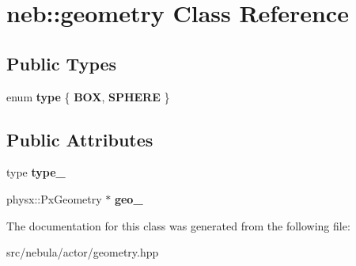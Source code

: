 \hypertarget{classneb_1_1geometry}{\section{neb\-:\-:geometry \-Class \-Reference}
\label{classneb_1_1geometry}
}
\subsection*{\-Public \-Types}
\begin{DoxyCompactItemize}
\item 
enum {\bfseries type} \{ {\bfseries \-B\-O\-X}, 
{\bfseries \-S\-P\-H\-E\-R\-E}
 \}
\end{DoxyCompactItemize}
\subsection*{\-Public \-Attributes}
\begin{DoxyCompactItemize}
\item 
\hypertarget{classneb_1_1geometry_a5747e38891f27136cd45a23ea986b595}{type {\bfseries type\-\_\-}}\label{classneb_1_1geometry_a5747e38891f27136cd45a23ea986b595}

\item 
\hypertarget{classneb_1_1geometry_a2e7f1ef07f66b904852c1ae9e84f9f55}{physx\-::\-Px\-Geometry $\ast$ {\bfseries geo\-\_\-}}\label{classneb_1_1geometry_a2e7f1ef07f66b904852c1ae9e84f9f55}

\end{DoxyCompactItemize}


\-The documentation for this class was generated from the following file\-:\begin{DoxyCompactItemize}
\item 
src/nebula/actor/geometry.\-hpp\end{DoxyCompactItemize}
